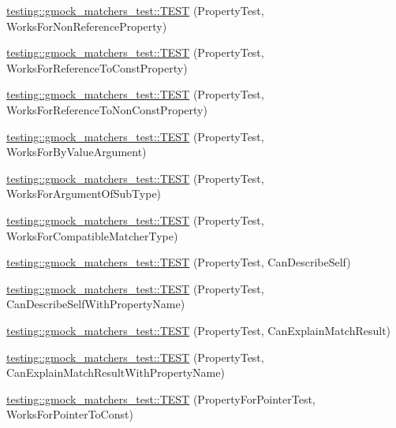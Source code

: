 \begin{DoxyCompactItemize}
\item 
\mbox{\hyperlink{namespacetesting_1_1gmock__matchers__test_a9c42c3b244c7b4d63040e469d5b31e1e}{testing\+::gmock\+\_\+matchers\+\_\+test\+::\+T\+E\+ST}} (Property\+Test, Works\+For\+Non\+Reference\+Property)
\item 
\mbox{\hyperlink{namespacetesting_1_1gmock__matchers__test_a7254899c6d45df648d5b4ef6eece3ae0}{testing\+::gmock\+\_\+matchers\+\_\+test\+::\+T\+E\+ST}} (Property\+Test, Works\+For\+Reference\+To\+Const\+Property)
\item 
\mbox{\hyperlink{namespacetesting_1_1gmock__matchers__test_a5b7b02e8fcef1aff9a4afc81d5fb5d5f}{testing\+::gmock\+\_\+matchers\+\_\+test\+::\+T\+E\+ST}} (Property\+Test, Works\+For\+Reference\+To\+Non\+Const\+Property)
\item 
\mbox{\hyperlink{namespacetesting_1_1gmock__matchers__test_af703b24e2bee13cf7a042f699809a5ab}{testing\+::gmock\+\_\+matchers\+\_\+test\+::\+T\+E\+ST}} (Property\+Test, Works\+For\+By\+Value\+Argument)
\item 
\mbox{\hyperlink{namespacetesting_1_1gmock__matchers__test_a38a5ad623dda9ef0f48ebaf65485d18e}{testing\+::gmock\+\_\+matchers\+\_\+test\+::\+T\+E\+ST}} (Property\+Test, Works\+For\+Argument\+Of\+Sub\+Type)
\item 
\mbox{\hyperlink{namespacetesting_1_1gmock__matchers__test_a17b7a59d1dbca0692ebaa71e6f46f1d6}{testing\+::gmock\+\_\+matchers\+\_\+test\+::\+T\+E\+ST}} (Property\+Test, Works\+For\+Compatible\+Matcher\+Type)
\item 
\mbox{\hyperlink{namespacetesting_1_1gmock__matchers__test_a8c749e210723e33547e58fe8822fb85e}{testing\+::gmock\+\_\+matchers\+\_\+test\+::\+T\+E\+ST}} (Property\+Test, Can\+Describe\+Self)
\item 
\mbox{\hyperlink{namespacetesting_1_1gmock__matchers__test_abcfb6f5efcd420b9acfeb1e9930a8dc2}{testing\+::gmock\+\_\+matchers\+\_\+test\+::\+T\+E\+ST}} (Property\+Test, Can\+Describe\+Self\+With\+Property\+Name)
\item 
\mbox{\hyperlink{namespacetesting_1_1gmock__matchers__test_aff810d2cdd79c55d483965a28bb5069a}{testing\+::gmock\+\_\+matchers\+\_\+test\+::\+T\+E\+ST}} (Property\+Test, Can\+Explain\+Match\+Result)
\item 
\mbox{\hyperlink{namespacetesting_1_1gmock__matchers__test_acd0d13c244310aeed3eb2dacccee644e}{testing\+::gmock\+\_\+matchers\+\_\+test\+::\+T\+E\+ST}} (Property\+Test, Can\+Explain\+Match\+Result\+With\+Property\+Name)
\item 
\mbox{\hyperlink{namespacetesting_1_1gmock__matchers__test_ac9222439b8e0b1e080650d667044c140}{testing\+::gmock\+\_\+matchers\+\_\+test\+::\+T\+E\+ST}} (Property\+For\+Pointer\+Test, Works\+For\+Pointer\+To\+Const)

\end{DoxyCompactItemize}
